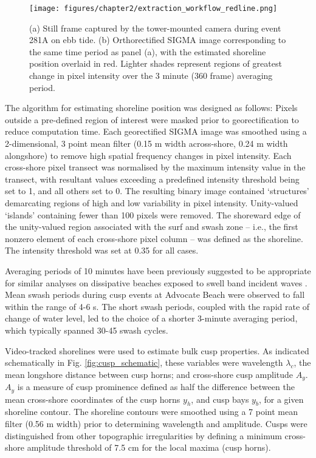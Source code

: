 \begin{figure}[tbp]
\begin{center}
 	\texttt{[image: figures/chapter2/extraction\_workflow\_redline.png]}
	\caption[Shoreline extraction from digital imagery]{(a) Still frame captured by the tower-mounted camera during event 281A on ebb tide. (b) Orthorectified SIGMA image corresponding to the same time period as panel (a), with the estimated shoreline position overlaid in red. Lighter shades represent regions of greatest change in pixel intensity over the 3 minute (360 frame) averaging period.}
	\label{fig:extraction_workflow}
\end{center}
\end{figure}

The algorithm for estimating shoreline position was designed as follows: Pixels outside a pre-defined region of interest were masked prior to georectification to reduce computation time. Each georectified SIGMA image was smoothed using a 2-dimensional, 3 point mean filter (0.15 m width across-shore, 0.24 m width alongshore) to remove high spatial frequency changes in pixel intensity. Each cross-shore pixel transect was normalised by the maximum intensity value in the transect, with resultant values exceeding a predefined intensity threshold being set to 1, and all others set to 0. The resulting binary image contained `structures' demarcating regions of high and low variability in pixel intensity. Unity-valued `islands' containing fewer than 100 pixels were removed. The shoreward edge of the unity-valued region associated with the surf and swash zone -- i.e., the first nonzero element of each cross-shore pixel column -- was defined as the shoreline. The intensity threshold was set at 0.35 for all cases.

Averaging periods of 10 minutes have been previously suggested to be appropriate for similar analyses on dissipative beaches exposed to swell band incident waves \citep{Plant_Holman1997}. Mean swash periods during cusp events at Advocate Beach were observed to fall within the range of 4-6 s. The short swash periods, coupled with the rapid rate of change of water level, led to the choice of a shorter 3-minute averaging period, which typically spanned 30-45 swash cycles.

Video-tracked shorelines were used to estimate bulk cusp properties. As indicated schematically in Fig. \ref{fig:cusp_schematic}, these variables were wavelength $\lambda_c$, the mean longshore distance between cusp horns; and cross-shore cusp amplitude $A_y$. $A_y$ is a measure of cusp prominence defined as half the difference between the mean cross-shore coordinates of the cusp horns $y_h$, and cusp bays $y_b$, for a given shoreline contour. The shoreline contours were smoothed using a 7 point mean filter (0.56 m width) prior to determining wavelength and amplitude. Cusps were distinguished from other topographic irregularities by defining a minimum cross-shore amplitude threshold of 7.5 cm for the local maxima (cusp horns). 

